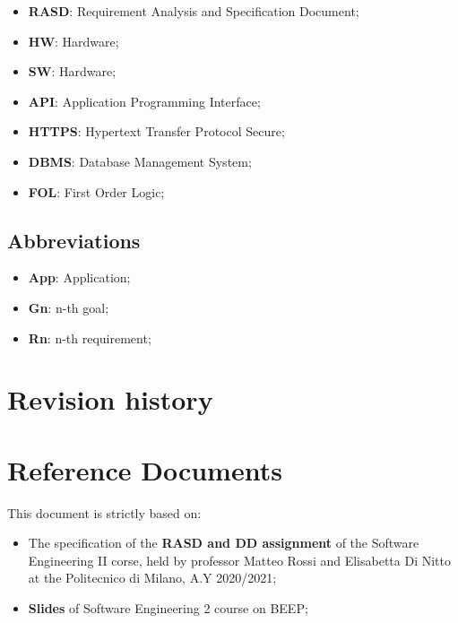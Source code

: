 \pagebreak

\begin{itemize}
\subsection{Acronyms}
\item \textbf{RASD}: Requirement Analysis and Specification Document;
\item \textbf{HW}: Hardware;
\item \textbf{SW}: Hardware;
\item \textbf{API}: Application Programming Interface;
\item \textbf{HTTPS}: Hypertext Transfer Protocol Secure;
\item \textbf{DBMS}: Database Management System;
\item \textbf{FOL}: First Order Logic;


\end{itemize}




\subsection{Abbreviations}
\begin{itemize}
\item \textbf{App}: Application;
\item \textbf{Gn}: n-th goal;
\item \textbf{Rn}: n-th requirement;
\end{itemize}



\section{Revision history}



\section{Reference Documents}
This document is strictly based on:
\begin{itemize}
\item The specification of the \textbf{RASD and DD assignment} of the Software Engineering II corse, held by professor Matteo Rossi and Elisabetta Di Nitto at the Politecnico di Milano, A.Y 2020/2021;
\item \textbf{Slides} of Software Engineering 2 course on BEEP;
\end{itemize}
